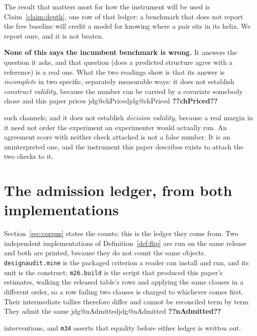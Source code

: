 \documentclass[11pt]{article}
\makeatletter
\newcommand{\jdg}[1]{%
  \ifcsname jdg@#1\endcsname\csname jdg@#1\endcsname
  \else\textbf{??#1??}\PackageError{nm}{undefined measured quantity #1}{}\fi}
\makeatother
\begin{document}
The result that matters most for how the instrument will be used is Claim~\ref{claim:depth}, one
row of that ledger: a benchmark that does not report the free baseline will credit a model for
knowing where a pair sits in its helix. We report ours, and it is not beaten.

\textbf{None of this says the incumbent benchmark is wrong.} It answers the question it asks, and that
question (does a predicted structure agree with a reference) is a real one. What the
two readings show is that its answer is \emph{incomplete} in two specific, separately measurable
ways: it does not establish \emph{construct validity}, because the number can be carried by a
covariate somebody chose and this paper prices \jdg{chPriced} such channels; and it does not
establish \emph{decision validity}, because a real margin in it need not order the experiment an
experimenter would actually run. An agreement score with neither check attached is not a false
number. It is an uninterpreted one, and the instrument this paper describes exists to attach the
two checks to it.






\appendix
\renewcommand{\thesection}{S\arabic{section}}
\setcounter{section}{0}
\section{The admission ledger, from both implementations}
\label{app:ledger}

Section~\ref{sec:corpus} states the counts; this is the ledger they come from. Two independent
implementations of Definition~\ref{def:flip} are run on the same release and both are printed,
because they do not count the same objects. \texttt{designaudit.mine} is the packaged criterion a
reader can install and run, and its unit is the construct; \texttt{m26.build} is the script that
produced this paper's estimates, walking the released table's rows and applying the same clauses in
a different order, so a row failing two clauses is charged to whichever comes first. Their
intermediate tallies therefore differ and cannot be reconciled term by term. They admit the same
\jdg{nAdmitted} interventions, and \texttt{m34} asserts that equality before either ledger is
written out.

\begin{table}[!htbp]
\centering\small
\caption{\textbf{Every construct, and what became of it.} Both implementations of the eligibility
criterion, on the same release.}
\label{tab:admission}

\end{table}
\end{document}

